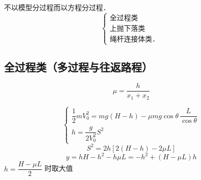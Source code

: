 不以模型分过程而以方程分过程．
\[
\begin{cases}
\text{全过程类}\\
\text{上抛下落类}\\
\text{绳杆连接体类．}
\end{cases}
\]

\subsection{全过程类（多过程与往返路程）}
\[ \mu=\frac{h}{x_1+x_2} \]

\begin{problem}
\begin{solution}
\[ \begin{cases} \dfrac12mV_0^2=mg(H-h)-\mu mg\cos\theta\,\dfrac{L}{\cos\theta}\\[6pt] h=\dfrac{g}{2V_0^2}S^2\end{cases} \]
\[ S^2=2h\left[2(H-h)-2\mu L\right] \]
\[ y=hH-h^2-h\mu L=-h^2+(H-\mu L)h \]
\noindent $h=\dfrac{H-\mu L}{2}$ 时取大值
\end{solution}
\end{problem}

